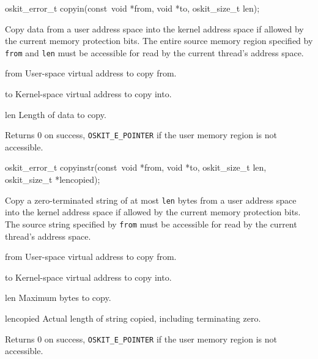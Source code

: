 \begin{apisyn}

        \funcproto oskit_error_t
		copyin(const~void *from, void *to, oskit_size_t len);
\end{apisyn}
\begin{apidesc}
	Copy data
	from a user address space into the kernel address space
	if allowed by the current memory protection bits.
        The entire source memory region specified by \texttt{from}
	and \texttt{len} must be accessible for read by the current
	thread's address space.
\end{apidesc}
\begin{apiparm}
	\item[from]
		User-space virtual address to copy from.
	\item[to]
		Kernel-space virtual address to copy into.
	\item[len]
		Length of data to copy.
\end{apiparm}
\begin{apiret}
        Returns 0 on success, \texttt{OSKIT_E_POINTER} if the user memory
	region is not accessible.
\end{apiret}

\begin{apisyn}

        \funcproto oskit_error_t
		copyinstr(const~void *from, void *to, oskit_size_t len,
		        \outparam oskit_size_t *lencopied);
\end{apisyn}
\begin{apidesc}
	Copy a zero-terminated string of at most \texttt{len} bytes
	from a user address space into the kernel address space
	if allowed by the current memory protection bits.
        The source string specified by \texttt{from}
	must be accessible for read by the current
	thread's address space.
\end{apidesc}
\begin{apiparm}
	\item[from]
		User-space virtual address to copy from.
	\item[to]
		Kernel-space virtual address to copy into.
	\item[len]
		Maximum bytes to copy.
	\item[lencopied]
		Actual length of string copied, including terminating zero.
\end{apiparm}
\begin{apiret}
        Returns 0 on success, \texttt{OSKIT_E_POINTER} if the user memory
	region is not accessible.
\end{apiret}

